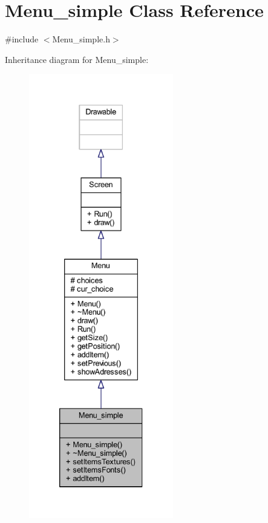\hypertarget{class_menu__simple}{}\section{Menu\+\_\+simple Class Reference}
\label{class_menu__simple}


{\ttfamily \#include $<$Menu\+\_\+simple.\+h$>$}



Inheritance diagram for Menu\+\_\+simple\+:
\nopagebreak
\begin{figure}[H]
\begin{center}
\leavevmode
\includegraphics[height=550pt]{class_menu__simple__inherit__graph}
\end{center}
\end{figure}



